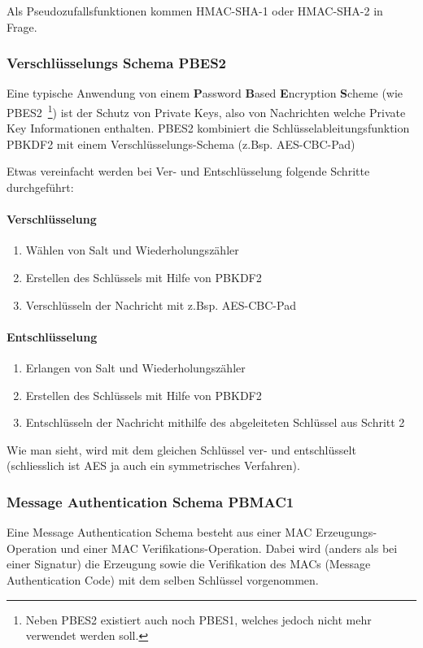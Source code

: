 \documentclass[10pt,a4paper]{article}
\begin{document}
Als Pseudozufallsfunktionen kommen HMAC-SHA-1 oder HMAC-SHA-2 in Frage.

\subsubsection{Verschlüsselungs Schema PBES2}
Eine typische Anwendung von einem \textbf{P}assword \textbf{B}ased \textbf{E}ncryption
\textbf{S}cheme (wie PBES2~\footnote{Neben PBES2 existiert auch noch PBES1, welches jedoch
nicht mehr verwendet werden soll.}) ist der Schutz von Private Keys, also von Nachrichten
welche Private Key Informationen enthalten. PBES2 kombiniert die
Schlüsselableitungsfunktion PBKDF2 mit einem Verschlüsselungs-Schema (z.Bsp. AES-CBC-Pad)

Etwas vereinfacht werden bei Ver- und Entschlüsselung folgende Schritte durchgeführt:
\paragraph{Verschlüsselung}
\begin{enumerate}
    \item Wählen von Salt und Wiederholungszähler
    \item Erstellen des Schlüssels mit Hilfe von PBKDF2
    \item Verschlüsseln der Nachricht mit z.Bsp. AES-CBC-Pad
\end{enumerate}

\paragraph{Entschlüsselung}
\begin{enumerate}
    \item Erlangen von Salt und Wiederholungszähler
    \item Erstellen des Schlüssels mit Hilfe von PBKDF2
    \item Entschlüsseln der Nachricht mithilfe des abgeleiteten Schlüssel aus Schritt 2
\end{enumerate}

Wie man sieht, wird mit dem gleichen Schlüssel ver- und entschlüsselt (schliesslich ist
AES ja auch ein symmetrisches Verfahren).

\subsubsection{Message Authentication Schema PBMAC1}
Eine Message Authentication Schema besteht aus einer MAC Erzeugungs-Operation und einer
MAC Verifikations-Operation. Dabei wird (anders als bei einer Signatur) die Erzeugung
sowie die Verifikation des MACs (Message Authentication Code) mit dem selben Schlüssel
vorgenommen.
\end{document}
